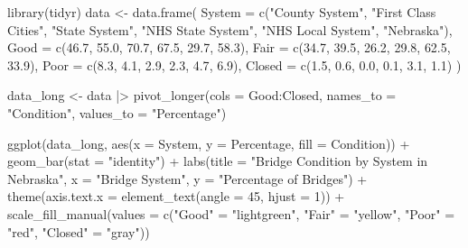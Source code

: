 \documentclass[
  letterpaper,
  DIV=11,
  numbers=noendperiod]{scrreprt}
\newenvironment{Shaded}{\begin{snugshade}}{\end{snugshade}}
\newcommand{\AttributeTok}[1]{\textcolor[rgb]{0.40,0.45,0.13}{#1}}
\newcommand{\DecValTok}[1]{\textcolor[rgb]{0.68,0.00,0.00}{#1}}
\newcommand{\FloatTok}[1]{\textcolor[rgb]{0.68,0.00,0.00}{#1}}
\newcommand{\FunctionTok}[1]{\textcolor[rgb]{0.28,0.35,0.67}{#1}}
\newcommand{\NormalTok}[1]{\textcolor[rgb]{0.00,0.23,0.31}{#1}}
\newcommand{\OtherTok}[1]{\textcolor[rgb]{0.00,0.23,0.31}{#1}}
\newcommand{\SpecialCharTok}[1]{\textcolor[rgb]{0.37,0.37,0.37}{#1}}
\newcommand{\StringTok}[1]{\textcolor[rgb]{0.13,0.47,0.30}{#1}}
\begin{document}
\begin{Shaded}
\begin{Highlighting}[]
\FunctionTok{library}\NormalTok{(tidyr)}
\NormalTok{data }\OtherTok{\textless{}{-}} \FunctionTok{data.frame}\NormalTok{(}
  \AttributeTok{System =} \FunctionTok{c}\NormalTok{(}\StringTok{"County System"}\NormalTok{, }\StringTok{"First Class Cities"}\NormalTok{, }\StringTok{"State System"}\NormalTok{, }\StringTok{"NHS State System"}\NormalTok{, }
             \StringTok{"NHS Local System"}\NormalTok{, }\StringTok{"Nebraska"}\NormalTok{),}
  \AttributeTok{Good =} \FunctionTok{c}\NormalTok{(}\FloatTok{46.7}\NormalTok{, }\FloatTok{55.0}\NormalTok{, }\FloatTok{70.7}\NormalTok{, }\FloatTok{67.5}\NormalTok{, }\FloatTok{29.7}\NormalTok{, }\FloatTok{58.3}\NormalTok{),}
  \AttributeTok{Fair =} \FunctionTok{c}\NormalTok{(}\FloatTok{34.7}\NormalTok{, }\FloatTok{39.5}\NormalTok{, }\FloatTok{26.2}\NormalTok{, }\FloatTok{29.8}\NormalTok{, }\FloatTok{62.5}\NormalTok{, }\FloatTok{33.9}\NormalTok{),}
  \AttributeTok{Poor =} \FunctionTok{c}\NormalTok{(}\FloatTok{8.3}\NormalTok{, }\FloatTok{4.1}\NormalTok{, }\FloatTok{2.9}\NormalTok{, }\FloatTok{2.3}\NormalTok{, }\FloatTok{4.7}\NormalTok{, }\FloatTok{6.9}\NormalTok{),}
  \AttributeTok{Closed =} \FunctionTok{c}\NormalTok{(}\FloatTok{1.5}\NormalTok{, }\FloatTok{0.6}\NormalTok{, }\FloatTok{0.0}\NormalTok{, }\FloatTok{0.1}\NormalTok{, }\FloatTok{3.1}\NormalTok{, }\FloatTok{1.1}\NormalTok{)}
\NormalTok{)}

\NormalTok{data\_long }\OtherTok{\textless{}{-}}\NormalTok{ data }\SpecialCharTok{|\textgreater{}}
  \FunctionTok{pivot\_longer}\NormalTok{(}\AttributeTok{cols =}\NormalTok{ Good}\SpecialCharTok{:}\NormalTok{Closed, }\AttributeTok{names\_to =} \StringTok{"Condition"}\NormalTok{, }\AttributeTok{values\_to =} \StringTok{"Percentage"}\NormalTok{)}

\FunctionTok{ggplot}\NormalTok{(data\_long, }\FunctionTok{aes}\NormalTok{(}\AttributeTok{x =}\NormalTok{ System, }\AttributeTok{y =}\NormalTok{ Percentage, }\AttributeTok{fill =}\NormalTok{ Condition)) }\SpecialCharTok{+}
  \FunctionTok{geom\_bar}\NormalTok{(}\AttributeTok{stat =} \StringTok{"identity"}\NormalTok{) }\SpecialCharTok{+}
  \FunctionTok{labs}\NormalTok{(}\AttributeTok{title =} \StringTok{"Bridge Condition by System in Nebraska"}\NormalTok{, }
       \AttributeTok{x =} \StringTok{"Bridge System"}\NormalTok{, }
       \AttributeTok{y =} \StringTok{"Percentage of Bridges"}\NormalTok{) }\SpecialCharTok{+}
  \FunctionTok{theme}\NormalTok{(}\AttributeTok{axis.text.x =} \FunctionTok{element\_text}\NormalTok{(}\AttributeTok{angle =} \DecValTok{45}\NormalTok{, }\AttributeTok{hjust =} \DecValTok{1}\NormalTok{)) }\SpecialCharTok{+}
  \FunctionTok{scale\_fill\_manual}\NormalTok{(}\AttributeTok{values =} \FunctionTok{c}\NormalTok{(}\StringTok{"Good"} \OtherTok{=} \StringTok{"lightgreen"}\NormalTok{, }\StringTok{"Fair"} \OtherTok{=} \StringTok{"yellow"}\NormalTok{, }\StringTok{"Poor"} \OtherTok{=} \StringTok{"red"}\NormalTok{, }\StringTok{"Closed"} \OtherTok{=} \StringTok{"gray"}\NormalTok{))}
\end{Highlighting}
\end{Shaded}
\end{document}
